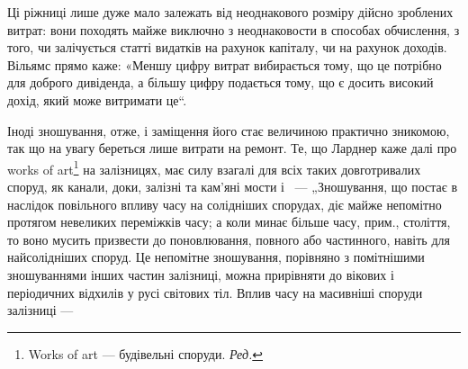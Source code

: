\noindent{}Ці ріжниці лише дуже мало залежать від неоднакового розміру дійсно зроблених витрат: вони походять
майже виключно з неоднаковости в способах обчислення, з того, чи залічується статті видатків на
рахунок капіталу, чи на рахунок доходів. Вільямс прямо каже: «Меншу цифру витрат вибирається тому,
що це потрібно для доброго дивіденда, а більшу цифру подається тому, що є досить високий дохід, який
може витримати це“.

Іноді зношування, отже, і заміщення його стає величиною практично зникомою, так що на увагу береться
лише витрати на ремонт. Те, що Ларднер каже далі про works of art\footnote*{
Works of art — будівельні споруди. \emph{Ред.}
} на залізницях, має силу взагалі
для всіх таких довготривалих споруд, як канали, доки, залізні та кам’яні мости і~ —
„Зношування, що постає в наслідок повільного впливу часу на солідніших спорудах, діє майже непомітно
протягом невеликих переміжків часу; а коли минає більше часу, прим., століття, то воно мусить
призвести до поновлювання, повного або частинного, навіть для найсолідніших споруд. Це непомітне
зношування, порівняно з помітнішими зношуваннями інших частин залізниці, можна прирівняти до вікових
і періодичних відхилів у русі світових тіл. Вплив часу на масивніші споруди залізниці —
\parbreak{}  %
